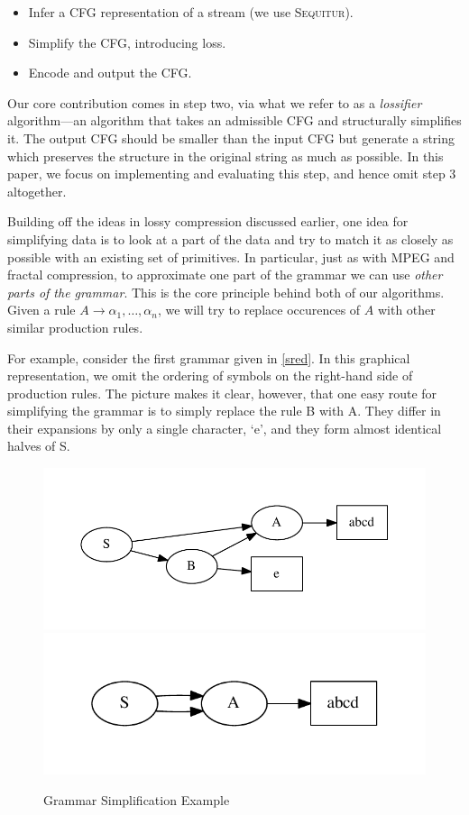 \documentclass[11pt]{article}
\newcommand{\Sequitur}{\textsc{Sequitur}\xspace}
\begin{document}
\begin{itemize}
  \item Infer a CFG representation of a stream (we use \Sequitur).
  \item Simplify the CFG, introducing loss.
  \item Encode and output the CFG.
\end{itemize}

Our core contribution comes in step two, via what we refer to as a
\emph{lossifier} algorithm---an algorithm that takes an admissible CFG and
structurally simplifies it.  The output CFG should be smaller than the input
CFG but generate a string which preserves the structure in the original string
as much as possible.  In this paper, we focus on implementing and evaluating
this step, and hence omit step 3 altogether.

Building off the ideas in lossy compression discussed earlier, one idea for
simplifying data is to look at a part of the data and try to match it as
closely as possible with an existing set of primitives.  In particular, just as
with MPEG and fractal compression, to approximate one part of the grammar we
can use \emph{other parts of the grammar}.  This is the core principle behind
both of our algorithms.  Given a rule $A \rightarrow \alpha_1, \ldots,
\alpha_n$, we will try to replace occurences of $A$ with other similar
production rules.

For example, consider the first grammar given in \autoref{sred}.  In this
graphical representation, we omit the ordering of symbols on the right-hand
side of production rules.  The picture makes it clear, however, that one easy
route for simplifying the grammar is to simply replace the rule B with A.  They
differ in their expansions by only a single character, `e', and they form
almost identical halves of S.

\begin{figure}[t]
\centering
\includegraphics[scale=0.6]{include/sred1.pdf}
\includegraphics[scale=0.6]{include/sred2.pdf}
\caption{Grammar Simplification Example}
\label{sred}
\end{figure}
\end{document}
